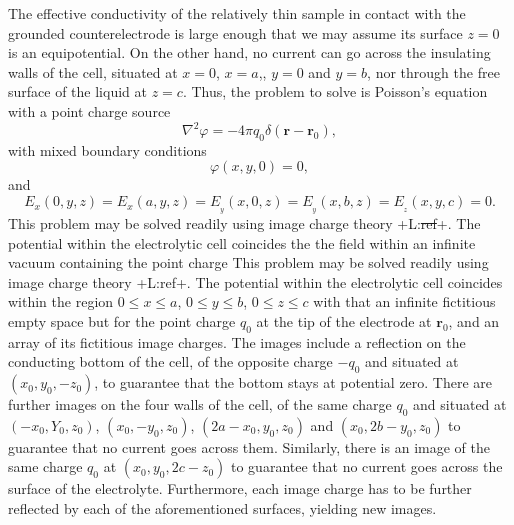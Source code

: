 \documentclass{article}
\newcommand{\notaL}[1]{{\color{blue}+L:#1+}}
\begin{document}
The effective conductivity of the relatively thin sample in contact
with the grounded counterelectrode is large enough that we may assume its
surface $z=0$ is an equipotential.
On the other hand, no current can go across the insulating walls of
the cell, situated at $x=0$, $x=a$,, $y=0$ and $y=b$, nor through the
free surface of the liquid at $z=c$. Thus, the problem to solve is Poisson's
equation with a point charge source
\begin{equation}
  \label{eq:poisson}
  \nabla^2\varphi=-4\pi q_0\delta(\bm r-\bm r_0),
\end{equation}
with mixed boundary conditions
\begin{equation}
  \label{eq:ground}
  \varphi(x,y,0)=0,
\end{equation}
and
\begin{equation}
E_x(0, y ,z)= E_x(a, y ,z)=E_{{_y}}(x, 0 ,z)=E_{{_y}}(x, b
,z)=E_{{_z}}(x, y ,c)=0.
\end{equation}
This problem may be solved readily using image charge theory \cite{T1,T2}
\notaL{\sout{ref}}. The potential within the electrolytic cell coincides the
the field within an infinite vacuum containing the point charge
This problem may be solved readily using image charge theory
\notaL{ref}. The potential within the electrolytic cell coincides
within the region $0\le x\le a$, $0\le y \le b$, $0\le z\le c$
with that an infinite fictitious empty space but for the point charge
$q_0$ at the tip of the electrode at $\bm r_0$, and an array of its fictitious image
charges. The images include a reflection on the conducting bottom of the
cell, of the opposite charge $-q_0$ and situated at $(x_0, y_0,-z_0)$,
to guarantee that the bottom stays at potential zero.
There are further images on the four walls of the cell, of the same charge $q_0$
and situated at $(-x_0,Y_0,z_0)$, $(x_0,-y_0, z_0)$, $(2a-x_0, y_0,
z_0)$ and $(x_0, 2b-y_0,z_0)$ to guarantee that no current goes across
them. Similarly, there is an image of the same charge $q_0$ at
$(x_0,y_0,2c-z_0)$ to guarantee that no current goes across the
surface of the electrolyte. Furthermore, each image charge has to be
further reflected by each of the aforementioned surfaces, yielding new
images.
\end{document}
